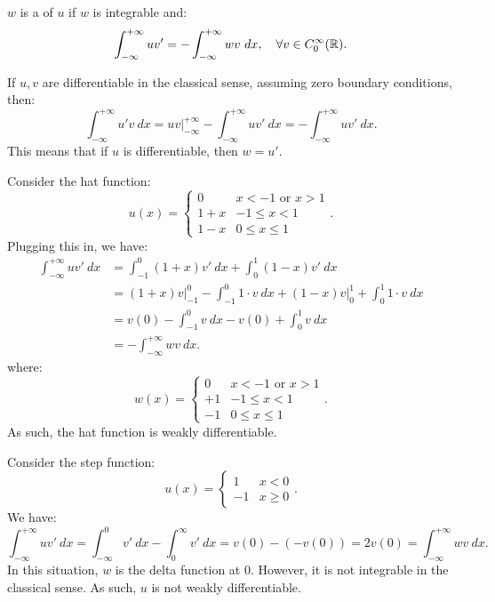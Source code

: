 \documentclass[../main/main.tex]{subfiles}
\begin{document}
\begin{definition}
    $w$ is a  of  $u$ if  $w$ is integrable and: \[
        \int ^{+\infty}_{-\infty} uv' = - \int ^{+\infty}_{-\infty} w v ~dx , \quad \forall  v \in  C^{\infty}_{0}(\mathbb{R})
    .\]  
\end{definition}
\begin{remark}
   If $u,v$ are differentiable in the classical sense, assuming zero boundary conditions, then: \[
   \int^{+\infty}_{-\infty} u'v ~dx = uv\bigg\rvert ^{+\infty}_{-\infty} - \int ^{+\infty}_{-\infty} uv'~dx = - \int ^{+\infty}_{-\infty} uv' ~dx
   .\]  This means that if $u$ is differentiable, then  $w=u'$.
\end{remark}
\begin{example}
   Consider the hat function: \[
       u(x) = \begin{cases}
       0 & x < -1 \text{ or } x > 1\\
       1+x & -1 \le  x < 1 \\
       1 - x & 0 \le  x \le  1 
   \end{cases}
   .\] Plugging this in, we have:
\begin{align*} 
\int ^{+\infty}_{-\infty} uv'~dx &= \int^0_{-1} (1+x) v' ~dx + \int^1_0 (1-x) v'~dx \\ 
                                 &= (1+x)v\bigg\rvert ^{0}_{-1} - \int^0_{-1}1\cdot  v~dx  + (1-x)v \bigg\rvert^1_0 + \int^1_0 1\cdot v~dx \\
                                 &= v(0) - \int^0_{-1}v~dx - v(0) + \int ^1_0 v~dx \\
                                 &= -\int^{+\infty}_{-\infty} w v~dx
.\end{align*} where: \[
w(x) = \begin{cases}
       0 & x < -1 \text{ or } x > 1\\
       +1 & -1 \le  x < 1 \\
       -1 & 0 \le  x \le  1 
\end{cases}
.\] As such, the hat function is weakly differentiable.
\end{example}
\begin{example}
    Consider the step function: \[
        u(x) = \begin{cases}
            1 & x < 0 \\
            -1 & x \ge  0
        \end{cases}
    .\] We have: \[
    \int ^{+\infty}_{-\infty} uv'~dx = \int ^{ 0}_{- \infty} v'~dx -\int ^{\infty}_0 v'~dx = v(0) - (-v(0)) = 2v(0) = \int ^{ +\infty}_{-\infty} w v~dx
    .\] In this situation, $w$ is the delta function at  $0$. However, it is not integrable in the classical sense. As such,  $u$ is not weakly differentiable.    
\end{example}
\end{document}
